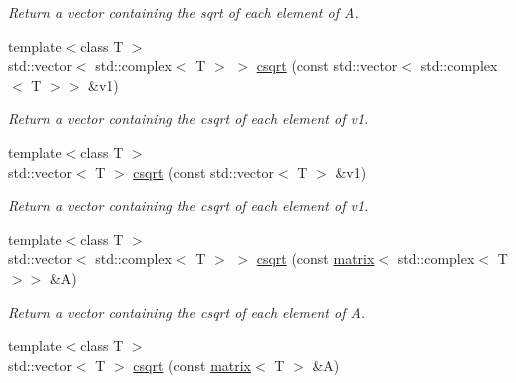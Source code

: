 \begin{DoxyCompactItemize}
\begin{DoxyCompactList}\small\item\em Return a vector containing the sqrt of each element of A. \end{DoxyCompactList}\item 
\hypertarget{namespacekeycpp_a9e9303ca44f49ec926854e6ad9506050}{{\footnotesize template$<$class T $>$ }\\std\-::vector$<$ std\-::complex$<$ T $>$ $>$ \hyperlink{namespacekeycpp_a9e9303ca44f49ec926854e6ad9506050}{csqrt} (const std\-::vector$<$ std\-::complex$<$ T $>$$>$ \&v1)}\label{namespacekeycpp_a9e9303ca44f49ec926854e6ad9506050}

\begin{DoxyCompactList}\small\item\em Return a vector containing the csqrt of each element of v1. \end{DoxyCompactList}\item 
\hypertarget{namespacekeycpp_a1e6c724d2e4067f9ae5fd3098da74bf6}{{\footnotesize template$<$class T $>$ }\\std\-::vector$<$ T $>$ \hyperlink{namespacekeycpp_a1e6c724d2e4067f9ae5fd3098da74bf6}{csqrt} (const std\-::vector$<$ T $>$ \&v1)}\label{namespacekeycpp_a1e6c724d2e4067f9ae5fd3098da74bf6}

\begin{DoxyCompactList}\small\item\em Return a vector containing the csqrt of each element of v1. \end{DoxyCompactList}\item 
\hypertarget{namespacekeycpp_a4ce9f002c4f3db2000a5c8d3a38f3ca5}{{\footnotesize template$<$class T $>$ }\\std\-::vector$<$ std\-::complex$<$ T $>$ $>$ \hyperlink{namespacekeycpp_a4ce9f002c4f3db2000a5c8d3a38f3ca5}{csqrt} (const \hyperlink{classkeycpp_1_1matrix}{matrix}$<$ std\-::complex$<$ T $>$$>$ \&A)}\label{namespacekeycpp_a4ce9f002c4f3db2000a5c8d3a38f3ca5}

\begin{DoxyCompactList}\small\item\em Return a vector containing the csqrt of each element of A. \end{DoxyCompactList}\item 
\hypertarget{namespacekeycpp_abe9f54061aba34fe730de8c35d68f9fe}{{\footnotesize template$<$class T $>$ }\\std\-::vector$<$ T $>$ \hyperlink{namespacekeycpp_abe9f54061aba34fe730de8c35d68f9fe}{csqrt} (const \hyperlink{classkeycpp_1_1matrix}{matrix}$<$ T $>$ \&A)}\label{namespacekeycpp_abe9f54061aba34fe730de8c35d68f9fe}


\end{DoxyCompactItemize}
